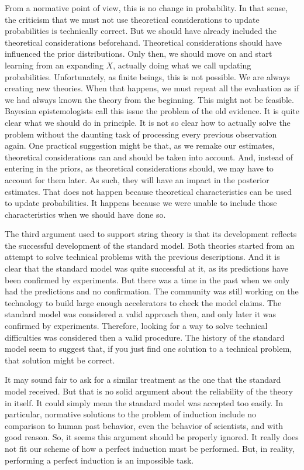 \documentclass{article}
\begin{document}
	
	From a normative point of view, this is no change in probability. In that sense, the criticism that we must not use theoretical considerations to update probabilities is technically correct. But we should have already included the theoretical considerations beforehand. Theoretical considerations should have influenced the prior distributions. Only then, we should move on and start learning from an expanding $X$, actually doing what we call updating probabilities. Unfortunately, as finite beings, this is not possible. We are always creating new theories. When that happens, we must repeat all the evaluation as if we had always known the theory from the beginning. This might not be feasible. Bayesian epistemologists call this issue the problem of the old evidence. It is quite clear what we should do in principle. It is not so clear how to actually solve the problem without the daunting task of processing every previous observation again. One practical suggestion might be that, as we remake our estimates, theoretical considerations can and should be taken into account. And, instead of entering in the priors, as theoretical considerations should, we may have to account for them later. As such, they will have an impact in the posterior estimates. That does not happen because theoretical characteristics can be used to update probabilities. It happens because we were unable to include those characteristics when we should have done so.
	
	
	The third argument used to support string theory is that its development reflects the successful development of the standard model. Both theories started from an attempt to solve technical problems with the previous descriptions. And it is clear that the standard model was quite successful at it, as its predictions have been confirmed by experiments. But there was a time in the past when we only had the predictions and no confirmation.  The community was still working on the technology to build large enough accelerators to check the model claims. The standard model was considered a valid approach then, and only later it was confirmed by experiments. Therefore, looking for a way to solve technical difficulties was considered then a valid procedure. The history of the standard model seem to suggest that, if you just find one solution to a technical problem, that solution might be correct. 
	
	
	It may sound fair to ask for a similar treatment as the one that the standard model received. But that is no solid argument about the reliability of the theory in itself. It could simply mean the standard model was accepted too easily. In particular, normative solutions to the problem of induction include no comparison to human past behavior, even the behavior of scientists, and with good reason. So, it seems this argument should be properly ignored. It really does not fit our scheme of how a perfect induction must be performed. But, in reality, performing a perfect induction is an impossible task.
	
\end{document}
